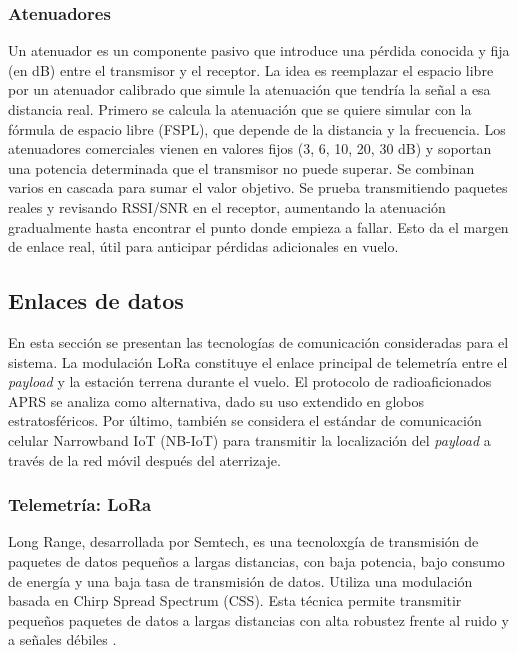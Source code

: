 \documentclass[12pt,a4paper]{article}
\begin{document}
\subsubsection{Atenuadores}\label{atenuadores}

Un atenuador es un componente pasivo que introduce una pérdida conocida y fija (en dB) entre el transmisor y el receptor. La idea es reemplazar el espacio libre por un atenuador calibrado que simule la atenuación que tendría la señal a esa distancia real. Primero se calcula la atenuación que se quiere simular con la fórmula de espacio libre (FSPL), que depende de la distancia y la frecuencia. Los atenuadores comerciales vienen en valores fijos (3, 6, 10, 20, 30 dB) y soportan una potencia determinada que el transmisor no puede superar. Se combinan varios en cascada para sumar el valor objetivo. Se prueba transmitiendo paquetes reales y revisando RSSI/SNR en el receptor, aumentando la atenuación gradualmente hasta encontrar el punto donde empieza a fallar. Esto da el margen de enlace real, útil para anticipar pérdidas adicionales en vuelo.

\subsection{Enlaces de datos}\label{enlaces-de-datos}

En esta sección se presentan las tecnologías de comunicación consideradas para el sistema. La modulación LoRa constituye el enlace principal de telemetría entre el \textit{payload} y la estación terrena durante el vuelo. El protocolo de radioaficionados APRS se analiza como alternativa, dado su uso extendido en globos estratosféricos. Por último, también se considera el estándar de comunicación celular Narrowband IoT (NB-IoT) para transmitir la localización del \textit{payload} a través de la red móvil después del aterrizaje. 

\subsubsection{Telemetría: LoRa}\label{lora}

Long Range, desarrollada por Semtech, es una tecnoloxgía de transmisión de paquetes de datos pequeños a largas distancias, con baja potencia, bajo consumo de energía y una baja tasa de transmisión de datos. Utiliza una modulación basada en Chirp Spread Spectrum (CSS). Esta técnica permite transmitir pequeños paquetes de datos a largas distancias con alta robustez frente al ruido y a señales débiles \cite{ref29,ref31}.
\end{document}
